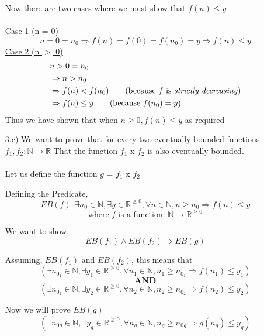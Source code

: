 \documentclass[20pt]{article}
\begin{document}
\begin{enumerate}
     Now there are two cases where we must show that $f(n) \leq y$ \\ \\
     \underline{Case 1 (n = 0)}\\
        \[n = 0 = n_0\Rightarrow f(n) = f(0) = f(n_0) = y \Rightarrow f(n) \leq y\]
    \underline{Case 2 (n $>$ 0)}\\
    \begin{align*}
         & n > 0 = n_0\\
         &\Rightarrow n > n_0\\
         &\Rightarrow f(n) < f(n_0) \tag{because $f$ is \emph{strictly decreasing}}\\
         &\Rightarrow f(n) \leq y \tag{because $f(n_0) = y$}
    \end{align*}
    Thus we have shown that when $n \geq 0, f(n) \leq y$ as required \hfill \Box
    \newpage
    \item[3.c)]
        We want to prove that for every two eventually bounded functions $f_1, f_2 :\mathbb{N} \to \mathbb{R}$ That the function $f_1$ x $f_2$ is also eventually bounded.\\ \\
        Let us define the function $g$ = $f_1$ x $f_2$
        
        
        Defining the Predicate,
        \[EB(f): \exists n_0 \in \mathbb{N}, \exists y \in \mathbb{R}^{\geq0}, \forall n \in \mathbb{N}, n \geq n_0 \Rightarrow f(n) \leq y\] 
        \[\text{where } f \text{ is a function: } \mathbb{N}\to \mathbb{R}^{\geq0}\]
        
        We want to show,
        \[EB(f_1) \wedge EB(f_2) \Rightarrow EB(g)\]
        
        Assuming, $EB(f_1)$ and $EB(f_2)$, this means that
        \[(\exists n_{0_1} \in \mathbb{N}, \exists y_1 \in \mathbb{R}^{\geq0}, \forall n_1 \in \mathbb{N}, n_1 \geq n_{0_1} \Rightarrow f(n_1) \leq y_1)\] 
        \[\textbf{AND}\]
        \[(\exists n_{0_2} \in \mathbb{N}, \exists y_2 \in \mathbb{R}^{\geq0}, \forall n_2 \in \mathbb{N}, n_2 \geq n_{0_2} \Rightarrow f(n_2) \leq y_2)\]
        
        Now we will prove $EB(g)$
        \[(\exists n_{0g} \in \mathbb{N}, \exists y_g \in \mathbb{R}^{\geq0}, \forall n_g \in \mathbb{N}, n_g \geq n_{0g} \Rightarrow g(n_g) \leq y_g)\]
        

\end{enumerate}
\end{document}

